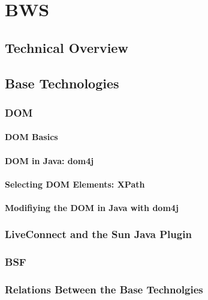 \section{BWS}
 \subsection{Technical Overview}
 \subsection{Base Technologies}
  \subsubsection{DOM}
  
    
   
   \paragraph{DOM Basics}
   
    
    
   \paragraph{DOM in Java: dom4j}
    
    
    
   \paragraph{Selecting DOM Elements: XPath}
   
    
   
   \paragraph{Modifiying the DOM in Java with dom4j}
   
    
    
  \subsubsection{LiveConnect and the Sun Java Plugin}
  \subsubsection{BSF}
  \subsubsection{Relations Between the Base Technolgies}
